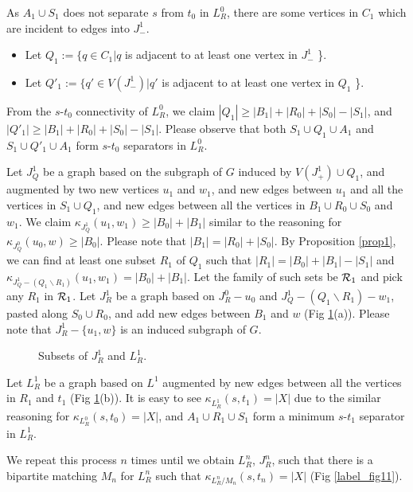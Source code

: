 \documentclass{article}
\begin{document}
As $A_1 \cup S_1$ does not separate $s$ from $t_0$ in $L_R^0$, there are some vertices in $C_1$ which are
incident to edges into $J_-^1$.
\begin{itemize}
\item Let $Q_1  := \{q\in C_1 | q$ is adjacent to at least one vertex in $J_-^1$ \}.
\item Let $Q'_1 := \{q'\in V(J_-^1) | q'$ is adjacent to at least one vertex in $Q_1$ \}.
\end{itemize}
From the $s$-$t_0$ connectivity of $L_R^0$, we claim $|Q_1|\ge |B_1|+|R_0|+|S_0|-|S_1|$, 
and $|Q'_1|\ge |B_1|+|R_0|+|S_0|-|S_1|$.
Please observe that both $S_1\cup Q_1 \cup A_1$ and $S_1\cup Q'_1 \cup A_1$ form $s$-$t_0$ separators in $L_R^0$.

Let $J_Q^1$ be a graph based on the subgraph of $G$ induced by $V(J_+^1)\cup Q_1$,
and augmented by two new vertices $u_1$ and $w_1$, and new edges between $u_1$ and all the vertices in $S_1 \cup Q_1$,
and new edges between all the vertices in $B_1 \cup R_0 \cup S_0$ and $w_1$.
We claim $\kappa_{J_Q^1}(u_1, w_1) \ge |B_0|+|B_1|$ similar to the reasoning for $\kappa_{J_Q^0}(u_0, w) \ge |B_0|$.
Please note that $|B_1| = |R_0| + |S_0|$.
By Proposition \ref{prop1}, we can find at least one subset $R_1$ of $Q_1$ such that $|R_1| = |B_0|+|B_1| - |S_1|$ and
$\kappa_{J_Q^1 - (Q_1\backslash R_1)}(u_1, w_1) = |B_0|+|B_1|$.
Let the family of such sets be ${\cal R}_1$ and pick any $R_1$ in ${\cal R}_1$.
Let $J_R^1$ be a graph based on $J_R^0 - u_0$ and $J_Q^1 - (Q_1\backslash R_1) - w_1$,
pasted along ${S_0 \cup R_0}$, and add new edges between $B_1$ and $w$ (Fig \ref{label_fig10}(a)).
Please note that $J_R^1 - \{u_1, w\}$ is an induced subgraph of $G$.

\begin{figure}\begin{center}
\caption[Fig10]{Subsets of $J_R^1$ and $L_R^1$.}
\label{label_fig10}
\end{center}\end{figure}

Let $L_R^1$ be a graph based on $L^1$ augmented by new edges between all the vertices in $R_1$ and $t_1$
(Fig \ref{label_fig10}(b)).
It is easy to see $\kappa_{L_R^1}(s, t_1) = |X|$
due to the similar reasoning for $\kappa_{L_R^0}(s, t_0) = |X|$,
and $A_1\cup R_1\cup S_1$ form a minimum $s$-$t_1$ separator in $L_R^1$.

We repeat this process $n$ times until we obtain $L_R^n$, $J_R^n$,
such that there is a bipartite matching $M_n$ for $L_R^n$ such that $\kappa_{L_R^n/M_n}(s, t_n) = |X|$
(Fig \ref{label_fig11}).
\end{document}
